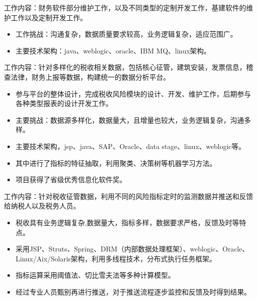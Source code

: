 \documentclass{resume}
\begin{document}
\begin{onehalfspacing}
工作内容：财务软件部分维护工作，以及不同类型的定制开发工作，基建软件的维护工作以及定制开发工作。
\begin{itemize}
  \item 工作挑战：沟通复杂，数据质量要求较高，业务逻辑复杂，适应范围广。
  \item 主要技术架构：java、weblogic、oracle、IBM MQ、linux架构。
\end{itemize}
\end{onehalfspacing}

\begin{onehalfspacing}
工作内容：针对多样化的税收相关数据，包括核心征管，建筑安装，发票信息，稽查法律，财务上报等数据，构建统一的数据分析平台。
\begin{itemize}
  \item 参与平台的整体设计，完成税收风险模块的设计、开发、维护工作，后期参与各种类型报表的设计开发工作。
  \item 主要挑战：数据源多样化，数据量大，且增量也较大，业务逻辑复杂，沟通多样。
  \item 主要技术架构，jsp、java、SAP、Oracle、data stage、linux、weblogic等。
  \item 其中进行了指标的特征抽取，利用聚类、决策树等机器学习方法。
  \item 项目获得了省级优秀信息化软件奖。
\end{itemize}
\end{onehalfspacing}

\begin{onehalfspacing}
工作内容：针对税收征管数据，利用不同的风险指标定时的监测数据并推送和反馈给纳税人以及税务人员。
\begin{itemize}
  \item 税收具有业务逻辑复杂,数据量大，指标多样，数据要求严格，反馈及时等特点。
  \item 采用JSP、Struts、Spring、DRM（内部数据处理框架）、weblogic、Oracle、Linux/Aix/Solaris架构，利用多线程技术，分布式执行任务框架。
  \item 指标运算采用阈值法、切比雪夫法等多种计算模型。
  \item 经过专业人员甄别再进行推送，对于推送流程逐步监控和反馈及时得到结果。
\end{itemize}
\end{onehalfspacing}
\end{document}
